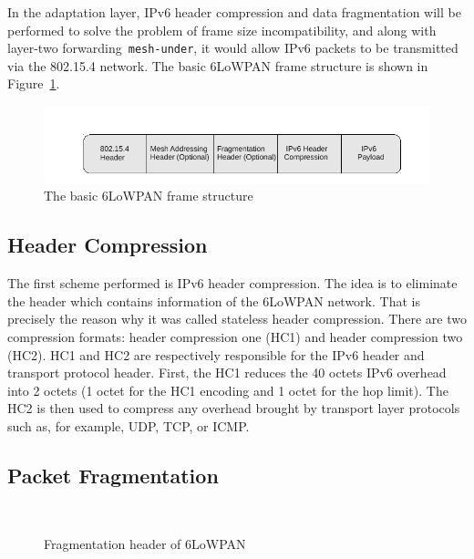 In the adaptation layer, IPv6 header compression and data fragmentation will be performed to solve the problem of frame size incompatibility, and along with layer-two forwarding~\texttt{mesh-under}, it would allow IPv6 packets to be transmitted via the 802.15.4 network. The basic 6LoWPAN frame structure is shown in Figure~\ref{fig:Frame}.  

\begin{figure}[htbp]
  \begin{center}
    \leavevmode
     \includegraphics[scale=1]{Pics/Frame.pdf}%
    \caption{The basic 6LoWPAN frame structure}
    \label{fig:Frame}
  \end{center}
\end{figure}

\subsection{Header Compression}
\label{IETF:HC}
The first scheme performed is IPv6 header compression. The idea is to eliminate the
header which contains information of the 6LoWPAN network. That is precisely the reason why it was called stateless header compression. There are two compression formats: header compression one (HC1) and header compression two (HC2)\@. HC1 and HC2 are respectively responsible for the IPv6 header and transport protocol header.  First, the HC1 reduces the 40 octets IPv6 overhead into 2 octets (1 octet for the HC1 encoding and 1 octet for the hop limit)\@. The HC2 is then used to compress any overhead brought by transport layer protocols such as, for example, UDP, TCP, or ICMP.

\subsection{Packet Fragmentation}
\label{IETF:PF}

\begin{figure}[htbp]
  \begin{center}
    \leavevmode
    \\
    \caption{Fragmentation header of 6LoWPAN}
    \label{fig:Fragmentation}
  \end{center}
\end{figure}

